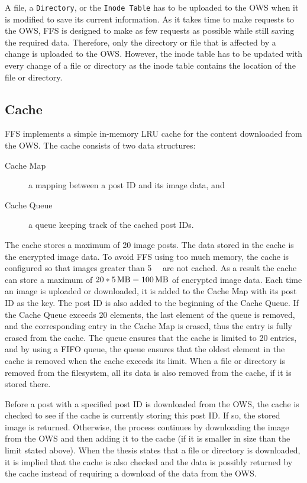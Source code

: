 A file, a \texttt{Directory}, or the \texttt{Inode Table} has to be uploaded to the \gls{OWS} when it is modified to save its current information. As it takes time to make requests to the \gls{OWS}, \gls{FFS} is designed to make as few requests as possible while still saving the required data. Therefore, only the directory or file that is affected by a change is uploaded to the \gls{OWS}. However, the inode table has to be updated with every change of a file or directory as the inode table contains the location of the file or directory.



\subsection{Cache}
\label{subsec:ffs_impl_cache}
\gls{FFS} implements a simple \mbox{in-memory} \gls{LRU} cache for the content downloaded from the \gls{OWS}. The cache consists of two data structures: 
\begin{description}
	\item[Cache Map] a mapping between a post ID and its image data, and
	\item[Cache Queue] a queue keeping track of the cached post IDs.
\end{description}
The cache stores a maximum of 20 image posts. The data stored in the cache is the encrypted image data. To avoid \gls{FFS} using too much memory, the cache is configured so that images greater than \SI{5}{\mega\byte} are not cached. As a result the cache can store a maximum of $20 * \text{\SI[per-mode = symbol]{5}{\mega\byte}} = \text{\SI[per-mode = symbol]{100}{\mega\byte}}$ of encrypted image data. Each time an image is uploaded or downloaded, it is added to the Cache Map with its post ID as the key. The post ID is also added to the beginning of the Cache Queue. If the Cache Queue exceeds 20 elements, the last element of the queue is removed, and the corresponding entry in the Cache Map is erased, thus the entry is fully erased from the cache. The queue ensures that the cache is limited to 20 entries, and by using a \gls{FIFO} queue, the queue ensures that the oldest element in the cache is removed when the cache exceeds its limit. When a file or directory is removed from the filesystem, all its data is also removed from the cache, if it is stored there.

Before a post with a specified post ID is downloaded from the \gls{OWS}, the cache is checked to see if the cache is currently storing this post ID. If so, the stored image is returned. Otherwise, the process continues by downloading the image from the \gls{OWS} and then adding it to the cache (if it is smaller in size than the limit stated above). When the thesis states that a file or directory is downloaded, it is implied that the cache is also checked and the data is possibly returned by the cache instead of requiring a download of the data from the \gls{OWS}.

